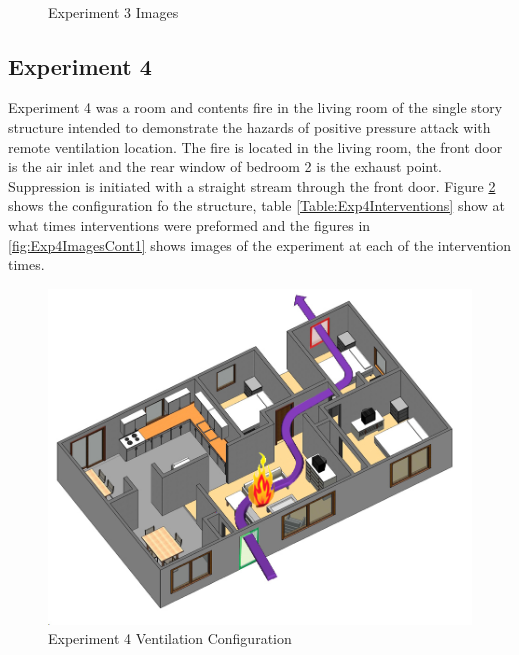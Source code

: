 \documentclass{article}
\begin{document}
\begin{figure}[H]
	\ContinuedFloat 
	\centering 
	 \ 
	\caption{Experiment 3 Images}
	\label{fig:Experiment3ImagesCont3} 
\end{figure}

\subsection{Experiment 4}
Experiment 4 was a room and contents fire in the living room of the single story structure intended to demonstrate the hazards of positive pressure attack with remote ventilation location. The fire is located in the living room, the front door is the air inlet and the rear window of bedroom 2 is the exhaust point. Suppression is initiated with a straight stream through the front door. Figure \ref{fig:Exp4VentConfig} shows the configuration fo the structure, table \ref{Table:Exp4Interventions} show at what times interventions were preformed and the figures in \ref{fig:Exp4ImagesCont1} shows images of the experiment at each of the intervention times.

\begin{figure}[H]
	\centering
	\includegraphics[width=5in]{0_Images/FireExperiments/Single_Story/Experiment_4.jpg}
	\caption{Experiment 4 Ventilation Configuration}
	\label{fig:Exp4VentConfig}
\end{figure}
\end{document}
